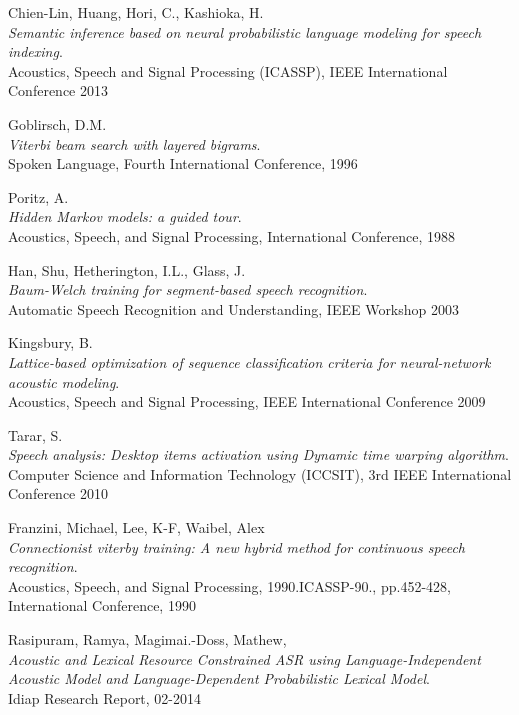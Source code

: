 \begin{thebibliography}{99}
  {\sc Chien-Lin,} Huang, {\sc Hori,} C., {\sc Kashioka,} H.\\
  \emph{Semantic inference based on neural probabilistic language modeling for speech indexing}.\\
  Acoustics, Speech and Signal Processing (ICASSP), IEEE International Conference 2013

  {\sc Goblirsch,} D.M.\\
  \emph{Viterbi beam search with layered bigrams}.\\
  Spoken Language, Fourth International Conference, 1996

  {\sc Poritz,} A.\\
  \emph{Hidden Markov models: a guided tour}.\\
  Acoustics, Speech, and Signal Processing, International Conference, 1988

  {\sc Han,} Shu, {\sc Hetherington,} I.L., {\sc Glass,} J.\\
  \emph{Baum-Welch training for segment-based speech recognition}.\\
  Automatic Speech Recognition and Understanding, IEEE Workshop 2003

  {\sc Kingsbury,} B.\\
  \emph{Lattice-based optimization of sequence classification criteria for neural-network acoustic modeling}.\\
  Acoustics, Speech and Signal Processing, IEEE International Conference 2009

  {\sc Tarar,} S.\\
  \emph{Speech analysis: Desktop items activation using Dynamic time warping algorithm}.\\
  Computer Science and Information Technology (ICCSIT), 3rd IEEE International Conference 2010 

  {\sc Franzini,} Michael, {\sc Lee,} K-F, {\sc Waibel,} Alex\\
  \emph{Connectionist viterby training: A new hybrid method for continuous speech recognition}.\\
  Acoustics, Speech, and Signal Processing, 1990.ICASSP-90., pp.452-428, International Conference, 1990
  
  {\sc Rasipuram,} Ramya, {\sc Magimai.-Doss,} Mathew, \\
  \emph{Acoustic and Lexical Resource Constrained ASR using Language-Independent Acoustic Model and Language-Dependent Probabilistic Lexical Model}.\\
  Idiap Research Report, 02-2014


\end{thebibliography}

